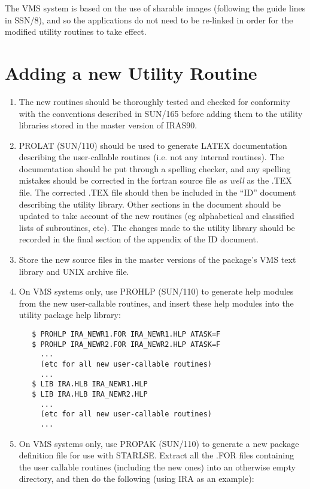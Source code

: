The {\small VMS} system is based on the use of sharable images (following
the guide lines in SSN/8), and so the applications do not need to be re-linked 
in order for the modified utility routines to take effect.

\section{Adding a new Utility Routine}
\begin{enumerate}
\item The new routines should be thoroughly tested and checked for conformity 
with the conventions described in SUN/165 before adding them to the
utility libraries stored in the master version of {\small IRAS90}. 

\item {\small PROLAT} (SUN/110) should be used to generate {\small LATEX}
documentation describing the user-callable routines (i.e. not any internal
routines). The documentation should be put through a spelling checker, and any
spelling mistakes should be corrected in the fortran source file {\em as well}
as the {\small .TEX} file. The corrected {\small .TEX} file should then be
included in the ``{\small ID}'' document describing the utility library. Other
sections in the document should be updated to take account of the new routines
(eg alphabetical and classified lists of subroutines, etc). The changes made to 
the utility library should be recorded in the final section of the appendix of 
the {\small ID} document.

\item Store the new source files in the master versions of the package's {\small
VMS} text library and {\small UNIX} archive file. 

\item On {\small VMS} systems only, use {\small PROHLP} (SUN/110) to generate 
help modules from the new user-callable routines, and insert these help modules 
into the utility package help library:

\small
\begin{verbatim}
   $ PROHLP IRA_NEWR1.FOR IRA_NEWR1.HLP ATASK=F
   $ PROHLP IRA_NEWR2.FOR IRA_NEWR2.HLP ATASK=F
     ... 
     (etc for all new user-callable routines)
     ...
   $ LIB IRA.HLB IRA_NEWR1.HLP
   $ LIB IRA.HLB IRA_NEWR2.HLP
     ... 
     (etc for all new user-callable routines)
     ... 
\end{verbatim}
\normalsize

\item On {\small VMS} systems only, use {\small PROPAK} (SUN/110) to generate a
new package definition file for use with {\small STARLSE}. Extract all the
{\small .FOR} files containing the user callable routines (including the new
ones) into an otherwise empty directory, and then do the following (using 
{\small IRA} as an example):


\end{enumerate}

